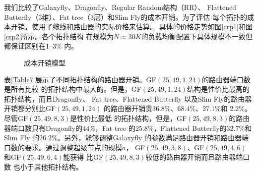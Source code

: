 我们比较了Galaxyfly、Dragonfly、Regular Random结构（RR）、
Flattened Butterfly（3维）、Fat tree（3层）和Slim Fly的成本开销。为了评估
每个拓扑的成本开销，使用了缆线和路由器的实际价格来估算。
具体的价格走势如图\ref{crp1}和图\ref{crp2}所示。各个拓扑结构
在规模为$N\approx30K$的负载均衡配置下具体规模不一致但都保证区别在1--3\% 内。

\begin{figure}[t]
  \centering
  \begin{minipage}[t]{\textwidth}
   \centering
  \caption{成本开销模型}
  \label{fig:Figure15}
  \end{minipage}
\end{figure}

表\ref{Table7}展示了不同拓扑结构的路由器开销。GF$(25,49,1,24)$的路由器端口数是所有比较
的拓扑结构中最大的。但是，GF$(25,49,1,24)$结构是性价比最高的拓扑结构，而且Dragonfly、
Fat tree、Flattened Butterfly 以及Slim Fly的路由器开销都分别比GF$(25,49,1,24)$
的路由器开销贵36.8\%、68.4\%、27.1\%和 2.2\%。尽管GF$(25,49,8,3)$是性价比最低
的拓扑结构，但是，GF$(25,49,8,3)$的路由器端口数只有Dragonfly的$44\%$，Fat tree
的$25.8\%$，Flattened Butterfly的$32.7\%$和Slim Fly 的$26.2\%$。另外，能够调整Galaxyfly
的参数满足路由器开销和路由器端口数的要求。通过调整超级节点的规模$a$，
GF$(25,49,3,8)$、GF$(25,49,4,6)$ 和GF$(25,49,6,4)$能获得
比GF$(25,49,8,3)$较低的路由器开销而且路由器端口数
也小于其他拓扑结构。



